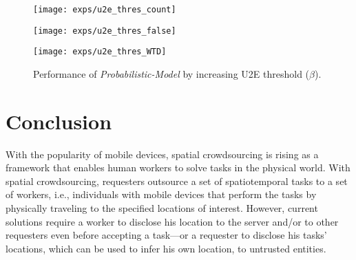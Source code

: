 \documentclass{USC-Thesis}
\numberwithin{equation}{chapter}
\begin{document}
\begin{figure}[!ht]
	\begin{minipage}[b]{0.32\linewidth}
	\centering
		\texttt{[image: exps/u2e\_thres\_count]}
		\label{fig:u2e_thres_count}
	\end{minipage}
	\begin{minipage}[b]{0.32\linewidth}
		\centering
		\texttt{[image: exps/u2e\_thres\_false]}
		\label{fig:u2e_thres_false}
	\end{minipage}
	\begin{minipage}[b]{0.32\linewidth}
	\centering
		\texttt{[image: exps/u2e\_thres\_WTD]}
		\label{fig:u2e_thres_WTD}
	\end{minipage}
	\caption{Performance of \emph{Probabilistic-Model} by increasing U2E threshold ($\beta$).}
\label{fig:vary_beta}
\end{figure}

\chapter{Conclusion}

With the popularity of mobile devices, spatial crowdsourcing is rising as a framework that enables
human workers to solve tasks in the physical world. With spatial crowdsourcing, requesters outsource a set of spatiotemporal tasks to a set of workers, i.e., individuals with mobile devices that perform the tasks by physically traveling to the specified locations of interest. However, current solutions require a worker to disclose his location to the server and/or to other requesters even before accepting a task---or a requester to disclose his tasks' locations, which can be used to infer his own location, to untrusted entities.
\end{document}
